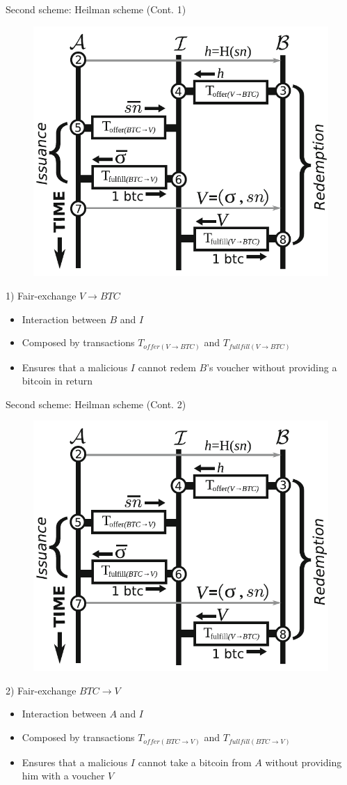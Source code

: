 \documentclass{beamer}
\begin{document}
  
  
  
  \begin{frame}{Second scheme: Heilman scheme (Cont. 1)}
      \begin{figure}
          \centering
          \includegraphics[width=0.4\linewidth]{../img/heilman-scheme.png}
      \end{figure}
      \begin{block}{1) Fair-exchange $V\rightarrow BTC$}
        \begin{itemize}
            \item Interaction between $B$ and $I$
            \item Composed by transactions $T_{offer(V\rightarrow BTC)}$ and $T_{fullfill(V\rightarrow BTC)}$
            \item Ensures that a malicious $I$ cannot redem $B$'s voucher without providing a bitcoin in return
        \end{itemize}
      \end{block}
  \end{frame}
  
  
  
  
  \begin{frame}{Second scheme: Heilman scheme (Cont. 2)}
      \begin{figure}
          \centering
          \includegraphics[width=0.4\linewidth]{../img/heilman-scheme.png}
      \end{figure}
      \begin{block}{2) Fair-exchange $BTC\rightarrow V$}
        \begin{itemize}
            \item Interaction between $A$ and $I$
            \item Composed by transactions $T_{offer(BTC\rightarrow V)}$ and $T_{fullfill(BTC\rightarrow V)}$
            \item Ensures that a malicious $I$ cannot take a bitcoin from $A$ without providing him with a voucher $V$
        \end{itemize}
      \end{block}
  \end{frame}
  
\end{document}
